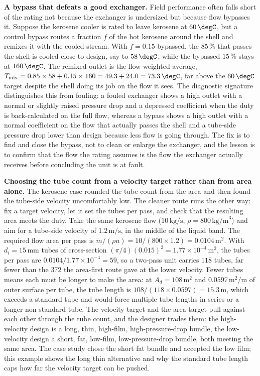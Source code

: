 \textbf{A bypass that defeats a good exchanger.} Field performance often falls
short of the rating not because the exchanger is undersized but because flow
bypasses it. Suppose the kerosene cooler is rated to leave kerosene at
$60\,\degC$, but a control bypass routes a fraction $f$ of the hot kerosene around
the shell and remixes it with the cooled stream. With $f = 0.15$ bypassed, the
$85\,\%$ that passes the shell is cooled close to design, say to $58\,\degC$,
while the bypassed $15\,\%$ stays at $160\,\degC$. The remixed outlet is the
flow-weighted average, $T_{\text{mix}} = 0.85\times 58 + 0.15\times 160 =
49.3 + 24.0 = 73.3\,\degC$, far above the $60\,\degC$ target despite the shell
doing its job on the flow it sees. The diagnostic signature distinguishes this
from fouling: a fouled exchanger shows a high outlet with a normal or slightly
raised pressure drop and a depressed coefficient when the duty is back-calculated
on the full flow, whereas a bypass shows a high outlet with a normal coefficient
on the flow that actually passes the shell and a tube-side pressure drop lower
than design because less flow is going through. The fix is to find and close the
bypass, not to clean or enlarge the exchanger, and the lesson is to confirm that
the flow the rating assumes is the flow the exchanger actually receives before
concluding the unit is at fault.

\textbf{Choosing the tube count from a velocity target rather than from area
alone.} The kerosene case rounded the tube count from the area and then found the
tube-side velocity uncomfortably low. The cleaner route runs the other way: fix a
target velocity, let it set the tubes per pass, and check that the resulting area
meets the duty. Take the same kerosene flow ($10\,\text{kg/s}$, $\rho =
800\,\text{kg/m}^3$) and aim for a tube-side velocity of $1.2\,\text{m/s}$, in the
middle of the liquid band. The required flow area per pass is $\dot{m}/(\rho u) =
10/(800\times 1.2) = 0.0104\,\text{m}^2$. With $d_i = 15\,\si{\milli\meter}$ tubes
of cross-section $(\pi/4)(0.015)^2 = 1.77\times 10^{-4}\,\text{m}^2$, the tubes per
pass are $0.0104/1.77\times 10^{-4} = 59$, so a two-pass unit carries $118$ tubes,
far fewer than the $372$ the area-first route gave at the lower velocity. Fewer
tubes means each must be longer to make the area: at $A_d = 108\,\text{m}^2$ and
$0.0597\,\text{m}^2/\text{m}$ of outer surface per tube, the tube length is
$108/(118\times 0.0597) = 15.3\,\text{m}$, which exceeds a standard tube and would
force multiple tube lengths in series or a longer non-standard tube. The velocity
target and the area target pull against each other through the tube count, and the
designer trades them: the high-velocity design is a long, thin, high-film,
high-pressure-drop bundle, the low-velocity design a short, fat, low-film,
low-pressure-drop bundle, both meeting the same area. The case study chose the
short fat bundle and accepted the low film; this example shows the long thin
alternative and why the standard tube length caps how far the velocity target can
be pushed.

